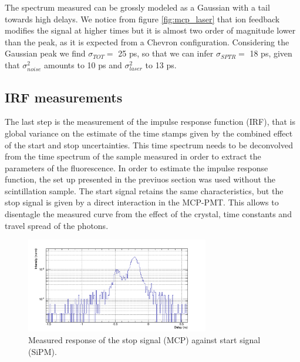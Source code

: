 The spectrum measured can be grossly modeled as a Gaussian with a tail towards high delays. 
We notice from figure \ref{fig:mcp_laser} that ion feedback modifies the signal at higher times but it is almost two order of magnitude lower than the peak, as it is expected from a Chevron configuration. Considering the Gaussian peak we find $\sigma _{TOT} =$ 25 ps, so that we can infer    $\sigma _{SPTR} = $ 18 ps, given that $\sigma _{noise}^{2}$ amounts to 10 ps and $\sigma _{laser}^{2}$ to 13 ps.

\subsection{IRF measurements}
The last step is the measurement of the impulse response function (IRF), that is global variance on the estimate of the time stamps given by the combined effect of the start and stop uncertainties. This time spectrum needs to be deconvolved from the time spectrum of the sample measured in order to extract the parameters of the fluorescence.
In order to estimate the impulse response function, the set up presented in the previuos section was used without the scintillation sample. The start signal retains the same characteristics, but the stop signal is given by a direct interaction in the MCP-PMT. This allows to disentagle the measured curve from the effect of the crystal, time constants and travel spread of the photons.
\begin{figure}[htbp]
\begin{center}
\includegraphics[width=8cm]{../Pictures/Chapter_8/response_cer_10}
\end{center}
\caption[Corrected IRF]{Measured response of the stop signal (MCP) against start signal (SiPM).}
\label{fig:ceren_10}
\end{figure}

